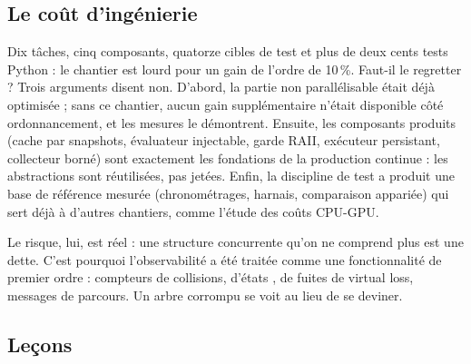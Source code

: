 \subsection{Le co\^ut d'ing\'enierie}

Dix t\^aches, cinq composants, quatorze cibles de test et plus de deux cents
tests Python : le chantier est lourd pour un gain de l'ordre de 10\,\%. Faut-il
le regretter ? Trois arguments disent non. D'abord, la partie non
parall\'elisable \'etait d\'ej\`a optimis\'ee ; sans ce chantier, aucun gain
suppl\'ementaire n'\'etait disponible c\^ot\'e ordonnancement, et les mesures
le d\'emontrent. Ensuite, les composants produits (cache par snapshots,
\'evaluateur injectable, garde RAII, ex\'ecuteur persistant, collecteur
born\'e) sont exactement les fondations de la production continue : les
abstractions sont r\'eutilis\'ees, pas jet\'ees. Enfin, la discipline de test
a produit une base de r\'ef\'erence mesur\'ee (chronom\'etrages, harnais,
comparaison appari\'ee) qui sert d\'ej\`a \`a d'autres chantiers, comme
l'\'etude des co\^uts CPU-GPU.

Le risque, lui, est r\'eel : une structure concurrente qu'on ne comprend plus
est une dette. C'est pourquoi l'observabilit\'e a \'et\'e trait\'ee comme une
fonctionnalit\'e de premier ordre : compteurs de collisions, d'\'etats
, de fuites de virtual loss, messages de parcours. Un arbre
corrompu se voit au lieu de se deviner.

\subsection{Le\c{c}ons}

